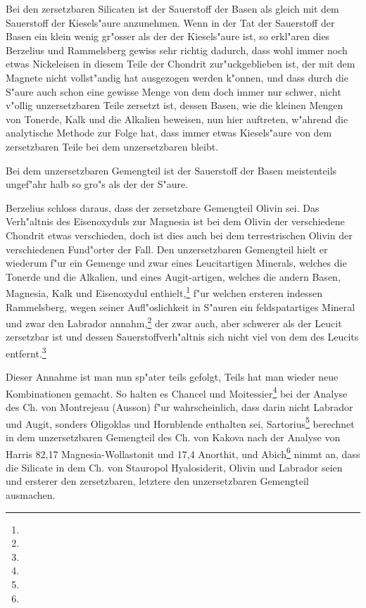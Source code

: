 \documentclass[a4paper, 11pt, oneside]{article}
\begin{document}
Bei den zersetzbaren Silicaten ist der Sauerstoff der Basen als gleich mit dem Sauerstoff der Kiesels"aure anzunehmen. Wenn in der Tat der Sauerstoff der Basen ein klein wenig gr"osser als der der Kiesels"aure ist, so erkl"aren dies Berzelius und Rammelsberg gewiss sehr richtig dadurch, dass wohl immer noch etwas Nickeleisen in diesem Teile der Chondrit zur"uckgeblieben ist, der mit dem Magnete nicht vollst"andig hat ausgezogen werden k"onnen, und dass durch die S"aure auch schon eine gewisse Menge von dem doch immer nur schwer, nicht v"ollig unzersetzbaren Teile zersetzt ist, dessen Basen, wie die kleinen Mengen von Tonerde, Kalk und die Alkalien beweisen, nun hier auftreten, w"ahrend die analytische Methode zur Folge hat, dass immer etwas Kiesels"aure von dem zersetzbaren Teile bei dem unzersetzbaren bleibt.

Bei dem unzersetzbaren Gemengteil ist der Sauerstoff der Basen meistenteils ungef"ahr halb so gro"s als der der S"aure.

Berzelius schloss daraus, dass der zersetzbare Gemengteil Olivin sei. Das Verh"altnis des Eisenoxyduls zur Magnesia ist bei dem Olivin der verschiedene Chondrit etwas verschieden, doch ist dies auch bei dem terrestrischen Olivin der verschiedenen Fund"orter der Fall. Den unzersetzbaren Gemengteil hielt er wiederum f"ur ein Gemenge und zwar eines Leucitartigen Minerals, welches die Tonerde und die Alkalien, und eines Augit-artigen, welches die andern Basen, Magnesia, Kalk und Eisenoxydul enthielt,\footnote{} f"ur welchen ersteren indessen Rammelsberg, wegen seiner Aufl"oslichkeit in S"auren ein feldspatartiges Mineral und zwar den Labrador annahm,\footnote{} der zwar auch, aber schwerer als der Leucit zersetzbar ist und dessen Sauerstoffverh"altnis sich nicht viel von dem des Leucits entfernt.\footnote{}

Dieser Annahme ist man nun sp"ater teils gefolgt, Teils hat man wieder neue Kombinationen gemacht. So halten es Chancel und Moitessier\footnote{} bei der Analyse des Ch. von Montrejeau (Ausson) f"ur wahrscheinlich, dass darin nicht Labrador und Augit, sonders Oligoklas und Hornblende enthalten sei, Sartorius\footnote{} berechnet in dem unzersetzbaren Gemengteil des Ch. von Kakova nach der Analyse von Harris 82,17 Magnesia-Wollastonit und 17,4 Anorthit, und Abich\footnote{} nimmt an, dass die Silicate in dem Ch. von Stauropol Hyalosiderit, Olivin und Labrador seien und ersterer den zersetzbaren, letztere den unzersetzbaren Gemengteil ausmachen.
\end{document}

